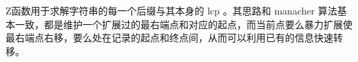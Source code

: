 Z函数用于求解字符串的每一个后缀与其本身的 lcp 。其思路和 manacher 算法基本一致，都是维护一个扩展过的最右端点和对应的起点，而当前点要么暴力扩展使最右端点右移，要么处在记录的起点和终点间，从而可以利用已有的信息快速转移。
\inputminted{cpp}{src/string/zfunc.cpp}